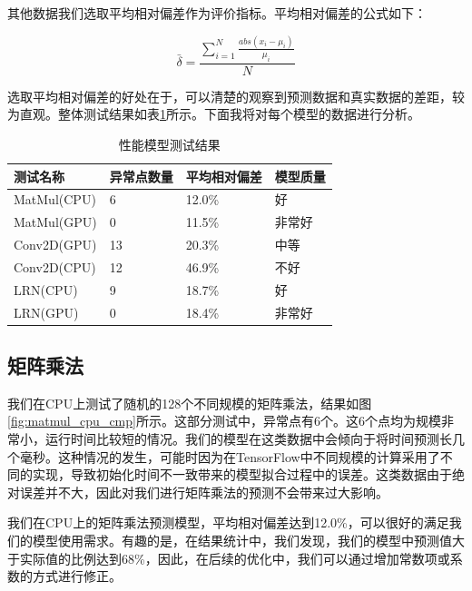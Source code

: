     其他数据我们选取平均相对偏差作为评价指标。平均相对偏差的公式如下：
    
    $$
        \bar{\delta} = \frac{\sum_{i=1}^N \frac{abs(x_i - \mu_i)}{\mu_i}}{N}
    $$
    
    选取平均相对偏差的好处在于，可以清楚的观察到预测数据和真实数据的差距，较为直观。整体测试结果如表\ref{tab:model}所示。下面我将对每个模型的数据进行分析。

    \begin{table}[!htbp]
        \centering
	    \caption{性能模型测试结果}
        \label{tab:model}
        \begin{tabular}{|l|l|l|l|}
            \hline
            测试名称 & 异常点数量 & 平均相对偏差 & 模型质量 \\
            \hline
            MatMul(CPU) & 6 & 12.0\% & 好 \\
            \hline
            MatMul(GPU) & 0 & 11.5\% & 非常好 \\
            \hline
            Conv2D(GPU) & 13 & 20.3\% & 中等 \\
            \hline
            Conv2D(CPU) & 12 & 46.9\% & 不好 \\
            \hline
            LRN(CPU) & 9 & 18.7\% & 好 \\
            \hline
            LRN(GPU) & 0 & 18.4\% & 非常好 \\
            \hline
        \end{tabular}
    \end{table}

\subsection{矩阵乘法}
    我们在CPU上测试了随机的128个不同规模的矩阵乘法，结果如图\ref{fig:matmul_cpu_cmp}所示。这部分测试中，异常点有6个。这6个点均为规模非常小，运行时间比较短的情况。我们的模型在这类数据中会倾向于将时间预测长几个毫秒。这种情况的发生，可能时因为在TensorFlow中不同规模的计算采用了不同的实现，导致初始化时间不一致带来的模型拟合过程中的误差。这类数据由于绝对误差并不大，因此对我们进行矩阵乘法的预测不会带来过大影响。
    
    我们在CPU上的矩阵乘法预测模型，平均相对偏差达到12.0\%，可以很好的满足我们的模型使用需求。有趣的是，在结果统计中，我们发现，我们的模型中预测值大于实际值的比例达到68\%，因此，在后续的优化中，我们可以通过增加常数项或系数的方式进行修正。

